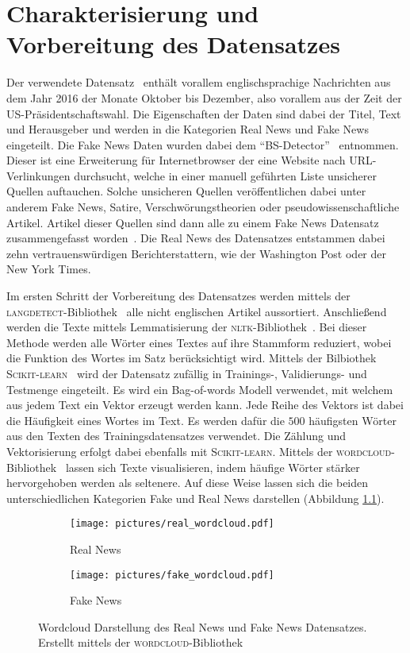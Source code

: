 \chapter{Charakterisierung und Vorbereitung des Datensatzes}
Der verwendete Datensatz~\cite{real_data} enthält vorallem englischsprachige Nachrichten aus dem Jahr 
2016 der Monate Oktober bis Dezember, also vorallem aus der Zeit der US-Präsidentschaftswahl.
Die Eigenschaften der Daten sind dabei der Titel, Text und Herausgeber und werden in die Kategorien 
Real News und Fake News eingeteilt. Die Fake News Daten wurden dabei dem 
\enquote{BS-Detector}~\cite{BS} entnommen. Dieser ist eine Erweiterung für Internetbrowser 
der eine Website nach URL-Verlinkungen durchsucht, welche in einer manuell geführten 
Liste unsicherer Quellen auftauchen. Solche unsicheren Quellen veröffentlichen dabei unter anderem 
Fake News, Satire, Verschwörungstheorien oder pseudowissenschaftliche Artikel. Artikel dieser Quellen 
sind dann alle zu einem Fake News Datensatz zusammengefasst worden~\cite{fake_data}. Die 
Real News des Datensatzes entstammen dabei zehn vertrauenswürdigen Berichterstattern, wie der 
Washington Post oder der New York Times. 

Im ersten Schritt der Vorbereitung des Datensatzes werden mittels der \textsc{langdetect}-Bibliothek~\cite{google_langdetect}
alle nicht englischen Artikel aussortiert. Anschließend werden die Texte mittels Lemmatisierung
der \textsc{nltk}-Bibliothek~\cite{nltk}. Bei dieser Methode werden alle Wörter eines Textes auf ihre Stammform reduziert,
wobei die Funktion des Wortes im Satz berücksichtigt wird. Mittels der Bilbiothek \textsc{Scikit-learn}~\cite{scikit-learn}
wird der Datensatz zufällig in Trainings-, Validierungs- und Testmenge eingeteilt. Es wird ein 
Bag-of-words Modell verwendet, mit welchem aus jedem Text ein Vektor erzeugt werden kann. Jede Reihe 
des Vektors ist dabei die Häufigkeit eines Wortes im Text. Es werden dafür die $500$ häufigsten Wörter 
aus den Texten des Trainingsdatensatzes verwendet. Die Zählung und Vektorisierung erfolgt dabei
ebenfalls mit \textsc{Scikit-learn}. Mittels der \textsc{wordcloud}-Bibliothek~\cite{wordcloud}
lassen sich Texte visualisieren, indem häufige Wörter stärker hervorgehoben werden als seltenere.
Auf diese Weise lassen sich die beiden unterschiedlichen Kategorien Fake und Real News darstellen
(Abbildung \ref{fig:WordcloudData}).

\begin{figure}
    \centering
    \begin{subfigure}{0.8\textwidth}
        \centering
        \texttt{[image: pictures/real\_wordcloud.pdf]}
        \caption{Real News}
    \end{subfigure}
    \begin{subfigure}{0.8\textwidth}
        \centering
        \texttt{[image: pictures/fake\_wordcloud.pdf]}
        \caption{Fake News}
    \end{subfigure}
    \caption{Wordcloud Darstellung des Real News und Fake News 
    Datensatzes. Erstellt mittels der \textsc{wordcloud}-Bibliothek~\cite{wordcloud} }
    \label{fig:WordcloudData}
\end{figure}

